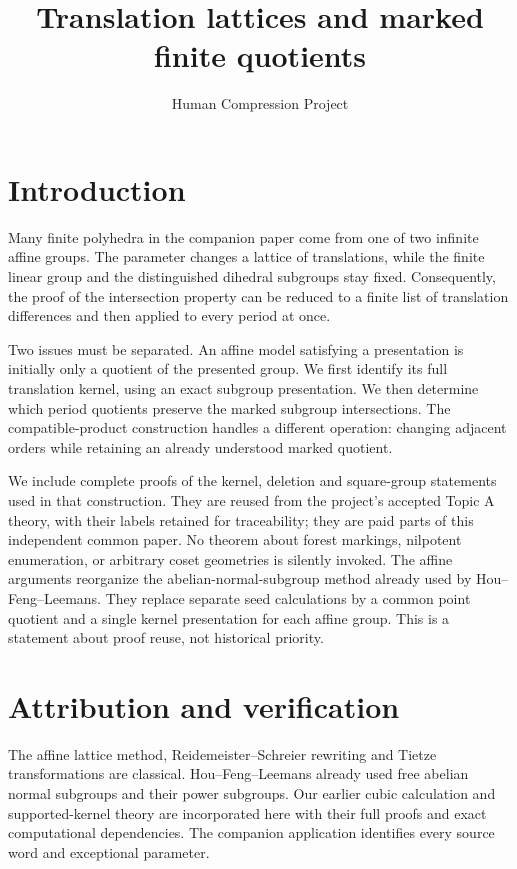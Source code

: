 
\title{Translation lattices and marked finite quotients}
\author{Human Compression Project}
\date{}

\maketitle
\section{Introduction}
Many finite polyhedra in the companion paper come from one of two infinite affine groups. The parameter changes a lattice of translations, while the finite linear group and the distinguished dihedral subgroups stay fixed. Consequently, the proof of the intersection property can be reduced to a finite list of translation differences and then applied to every period at once.

Two issues must be separated. An affine model satisfying a presentation is initially only a quotient of the presented group. We first identify its full translation kernel, using an exact subgroup presentation. We then determine which period quotients preserve the marked subgroup intersections. The compatible-product construction handles a different operation: changing adjacent orders while retaining an already understood marked quotient.

We include complete proofs of the kernel, deletion and square-group statements used in that construction. They are reused from the project's accepted Topic A theory, with their labels retained for traceability; they are paid parts of this independent common paper. No theorem about forest markings, nilpotent enumeration, or arbitrary coset geometries is silently invoked. The affine arguments reorganize the abelian-normal-subgroup method already used by Hou--Feng--Leemans. They replace separate seed calculations by a common point quotient and a single kernel presentation for each affine group. This is a statement about proof reuse, not historical priority.






\section*{Attribution and verification}
The affine lattice method, Reidemeister--Schreier rewriting and Tietze transformations are classical. Hou--Feng--Leemans already used free abelian normal subgroups and their power subgroups. Our earlier cubic calculation and supported-kernel theory are incorporated here with their full proofs and exact computational dependencies. The companion application identifies every source word and exceptional parameter.

